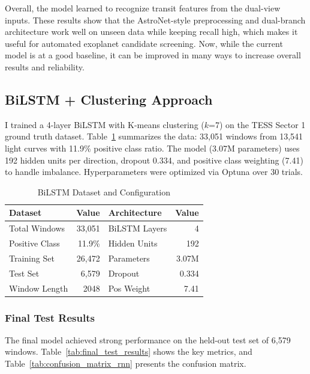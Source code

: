 \documentclass[letterpaper]{article} %
\begin{document}
Overall, the model learned to recognize transit features from the dual-view inputs. These results show that the AstroNet-style preprocessing and dual-branch architecture work well on unseen data while keeping recall high, which makes it useful for automated exoplanet candidate screening. Now, while the current model is at a good baseline, it can be improved in many ways to increase overall results and reliability.

\subsection{BiLSTM + Clustering Approach}

I trained a 4-layer BiLSTM with K-means clustering ($k$=7) on the TESS Sector 1 ground truth dataset. Table~\ref{tab:bilstm_dataset} summarizes the data: 33,051 windows from 13,541 light curves with 11.9\% positive class ratio. The model (3.07M parameters) uses 192 hidden units per direction, dropout 0.334, and positive class weighting (7.41) to handle imbalance. Hyperparameters were optimized via Optuna over 30 trials.

\begin{table}[h]
\centering
\caption{BiLSTM Dataset and Configuration}
\label{tab:bilstm_dataset}
\begin{tabular}{@{}lr|lr@{}}
\toprule
\textbf{Dataset} & \textbf{Value} & \textbf{Architecture} & \textbf{Value} \\
\midrule
Total Windows & 33,051 & BiLSTM Layers & 4 \\
Positive Class & 11.9\% & Hidden Units & 192 \\
Training Set & 26,472 & Parameters & 3.07M \\
Test Set & 6,579 & Dropout & 0.334 \\
Window Length & 2048 & Pos Weight & 7.41 \\
\bottomrule
\end{tabular}
\end{table}

\subsubsection{Final Test Results}

The final model achieved strong performance on the held-out test set of 6,579 windows. Table~\ref{tab:final_test_results} shows the key metrics, and Table~\ref{tab:confusion_matrix_rnn} presents the confusion matrix.
\end{document}
